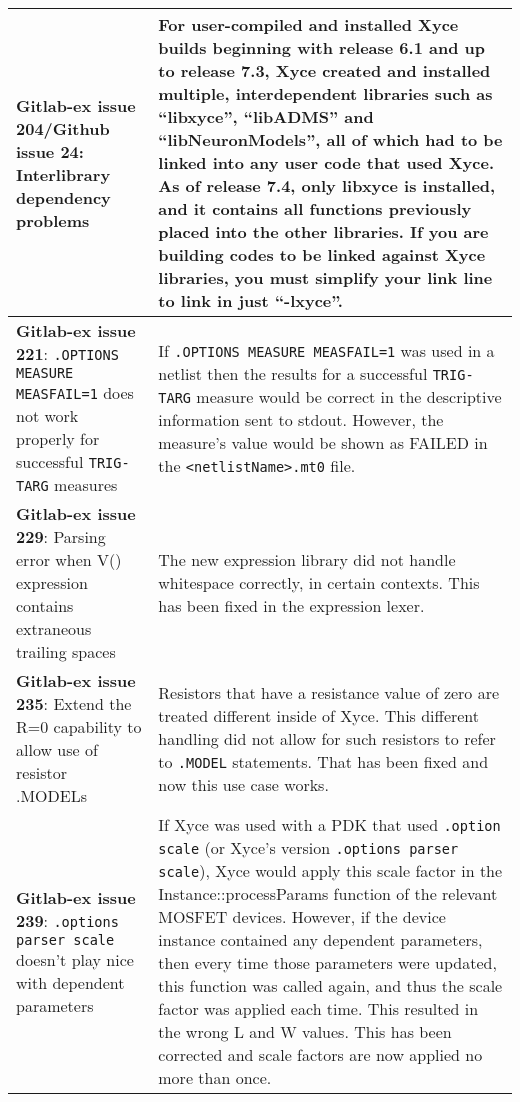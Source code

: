 {\begin{longtable}[h] {>{\raggedright\small}m{2in}|>{\raggedright\let\\\tabularnewline\small}m{3.5in}}
\textbf{Gitlab-ex issue 204/Github issue 24}: Interlibrary dependency problems &
For user-compiled and installed Xyce builds beginning with release 6.1
and up to release 7.3, Xyce created and installed multiple,
interdependent libraries such as ``libxyce'', ``libADMS'' and
``libNeuronModels'', all of which had to be linked into any user code
that used Xyce.  As of release 7.4, only libxyce is installed, and it
contains all functions previously placed into the other libraries.  If
you are building codes to be linked against Xyce libraries, you must
simplify your link line to link in just ``-lxyce''.\\ \hline

  \textbf{Gitlab-ex issue 221}: \texttt{.OPTIONS MEASURE MEASFAIL=1}
does not work properly for successful \texttt{TRIG-TARG} measures &
If \texttt{.OPTIONS MEASURE MEASFAIL=1} was used in a netlist then the
results for a successful \texttt{TRIG-TARG} measure would be correct
in the descriptive information sent to stdout.  However, the measure's
value would be shown as FAILED in the \texttt{<netlistName>.mt0}
file. \\ \hline

  \textbf{Gitlab-ex issue 229}: Parsing error when V() expression
contains extraneous trailing spaces & The new expression library did
not handle whitespace correctly, in certain contexts.  This has been
fixed in the expression lexer.  \\ \hline

  \textbf{Gitlab-ex issue 235}: Extend the R=0 capability to allow use
of resistor .MODELs & Resistors that have a resistance value of zero
are treated different inside of Xyce.  This different handling did not
allow for such resistors to refer to \texttt{.MODEL} statements.  That
has been fixed and now this use case works.  \\ \hline

  \textbf{Gitlab-ex issue 239}: \texttt{.options parser scale} doesn't
play nice with dependent parameters & If Xyce was used with a PDK that
used \texttt{.option scale} (or Xyce's version \texttt{.options parser
scale}), Xyce would apply this scale factor in the
Instance::processParams function of the relevant MOSFET devices.
However, if the device instance contained any dependent parameters,
then every time those parameters were updated, this function was
called again, and thus the scale factor was applied each time. This
resulted in the wrong L and W values.  This has been corrected and
scale factors are now applied no more than once.  \\ \hline


\end{longtable}}
